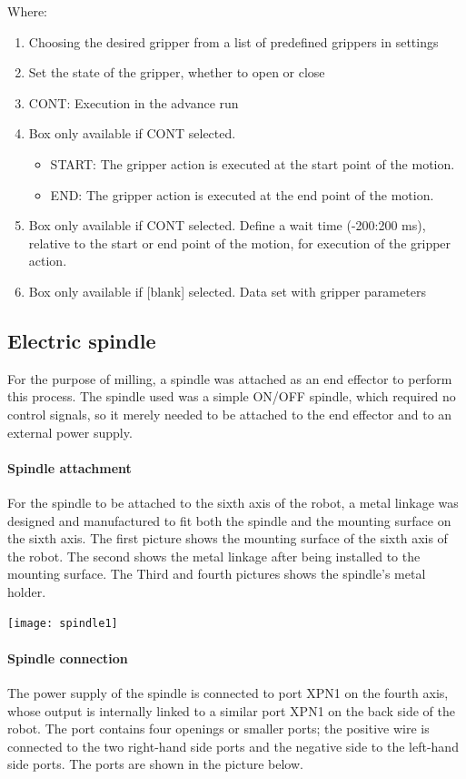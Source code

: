 Where:
\begin{enumerate}
	\item Choosing the desired gripper from a list of predefined grippers in settings
	\item Set the state of the gripper, whether to open or close
	\item CONT: Execution in the advance run
	\item Box only available if CONT selected.
		\begin{itemize}
			\item START: The gripper action is executed at the start point of the motion.
			\item END: The gripper action is executed at the end point of the motion.
		\end{itemize}
	\item Box only available if CONT selected.
		Define a wait time (-200:200 ms), relative to the start or end point of the motion, for execution of the gripper action.
	\item Box only available if [blank] selected.
	Data set with gripper parameters
\end{enumerate}

\subsection{Electric spindle}
For the purpose of milling, a spindle was attached as an end effector to perform this process. The spindle used was a simple ON/OFF spindle, which required no control signals, so it merely needed to be attached to the end effector and to an external power supply. 

\paragraph{Spindle attachment }
For the spindle to be attached to the sixth axis of the robot, a metal linkage was designed and manufactured to fit both the spindle and the mounting surface on the sixth axis. The first picture shows the mounting surface of the sixth axis of the robot. The second shows the metal linkage after being installed to the mounting surface. The Third and fourth pictures shows the spindle’s metal holder. 

\begin{center}
\texttt{[image: spindle1]}
\end{center}

\paragraph{Spindle connection}
The power supply of the spindle is connected to port XPN1 on the fourth axis, whose output is internally linked to a similar port XPN1 on the back side of the robot. The port contains four openings or smaller ports; the positive wire is connected to the two right-hand side ports and the negative side to the left-hand side ports. The ports are shown in the picture below.


